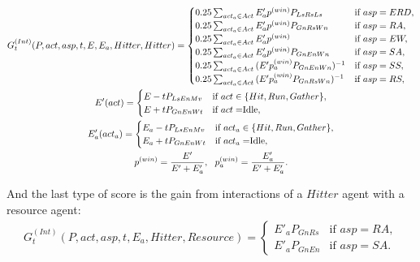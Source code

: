 \begin{equation*}
    \begin{gathered}
        G_t^{(Int)}(P, act, asp, t, E, E_a, Hitter, Hitter) = \begin{cases}
            0.25 \sum_{act_a \in Act} {E'_ap^{(win)}P_{LsRsLs}}  & \mbox{if  } asp = ERD,\\
            0.25 \sum_{act_a \in Act} {E'_ap^{(win)}P_{GnRsWn}}  & \mbox{if  } asp = RA,\\
            0.25 \sum_{act_a \in Act} {E'_ap^{(win)}}  & \mbox{if  } asp = EW,\\
            0.25 \sum_{act_a \in Act} {E'_ap^{(win)}P_{GnEnWn}}  & \mbox{if  } asp = SA,\\
            0.25 \sum_{act_a \in Act} {(E'p_a^{(win)}P_{GnEnWn})^{-1}}  & \mbox{if  } asp = SS,\\
            0.25 \sum_{act_a \in Act} {(E'p_a^{(win)}P_{GnRsWn})^{-1}}  & \mbox{if  } asp = RS,
        \end{cases} \\
        E'(act) = \begin{cases}
            E - tP_{LsEnMv} & \mbox{if } act \in \{Hit, Run, Gather\},\\
            E + tP_{GnEnWt} & \mbox{if } act = $Idle$,
        \end{cases}\\
        E_a'(act_a) = \begin{cases}
            E_a - tP_{LsEnMv} & \mbox{if } act_a \in \{Hit, Run, Gather\},\\
            E_a + tP_{GnEnWt} & \mbox{if } act_a = $Idle$,
        \end{cases}\\
        p^{(win)} = \frac {E'} {E' + E'_a},\ \
        p^{(win)}_a = \frac {E'_a} {E' + E'_a}.
    \end{gathered}
\end{equation*}

And the last type of score is the gain from interactions of a $Hitter$ agent with a resource agent:
\begin{equation*}
    \begin{gathered}
        G_t^{(Int)}(P, act, asp, t, E_a, Hitter, Resource) = \begin{cases}
            {E'_aP_{GnRs}}  & \mbox{if  } asp = RA,\\
            {E'_aP_{GnEn}}  & \mbox{if  } asp = SA.
        \end{cases}
    \end{gathered}
\end{equation*}

